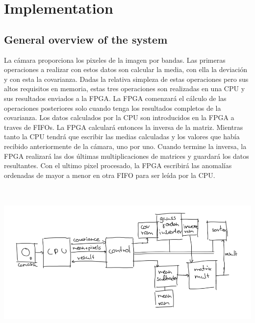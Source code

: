 
\cleardoublepage

\chapter{Implementation}
\label{makereference}

\section{General overview of the system}
La cámara proporciona los pixeles de la imagen por bandas. Las primeras operaciones a realizar con estos datos son calcular la media, con ella la deviación y con esta la covarianza. Dadas la relativa simpleza de estas operaciones pero sus altos requisitos en memoria, estas tres operaciones son realizadas en una CPU y sus resultados enviados a la FPGA. La FPGA comenzará el cálculo de las operaciones posteriores solo cuando tenga los resultados completos de la covarianza.
Los datos calculados por la CPU son introducidos en la FPGA a traves de FIFOs.
La FPGA calculará entonces la inversa de la matriz. Mientras tanto la CPU tendrá que escribir las medias calculadas y los valores que había recibido anteriormente de la cámara, uno por uno. Cuando termine la inversa, la FPGA realizará las dos últimas multiplicaciones de matrices y guardará los datos resultantes. Con el ultimo pixel procesado, la FPGA escribirá las anomalías ordenadas de mayor a menor en otra FIFO para ser leída por la CPU.
\\
\includegraphics[height=3.5in]{figures/bus.png}


